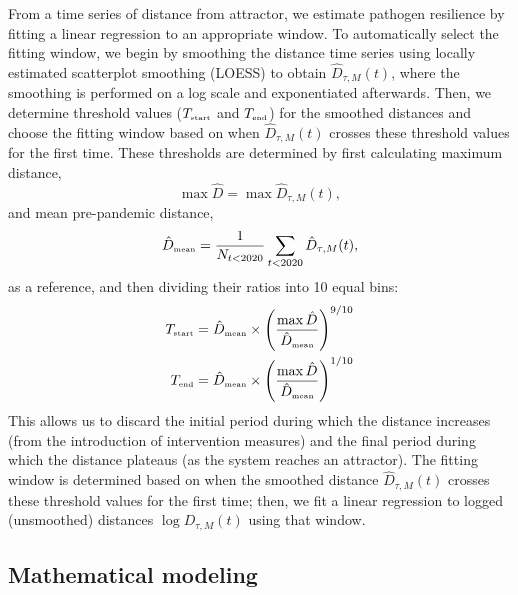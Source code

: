 \documentclass[12pt]{article}
\newcommand{\tsub}[2]{#1_{{\textrm{\tiny #2}}}}
\begin{document}
From a time series of distance from attractor, we estimate pathogen resilience by fitting a linear regression to an appropriate window.
To automatically select the fitting window, we begin by smoothing the distance time series using locally estimated scatterplot smoothing (LOESS) to obtain $\hat{D}_{\tau,M}(t)$, where the smoothing is performed on a log scale and exponentiated afterwards.
Then, we determine threshold values ($\tsub{T}{start}$ and $\tsub{T}{end}$) for the smoothed distances and choose the fitting window based on when $\hat{D}_{\tau,M}(t)$ crosses these threshold values for the first time.
These thresholds are determined by first calculating maximum distance,
\begin{equation}
\max \hat{D} = \max \hat{D}_{\tau,M}(t),
\end{equation}
and mean pre-pandemic distance,
\begin{equation}
\tsub{\hat{D}}{mean} = \frac{1}{N_{t<2020}} \sum_{t < 2020} \hat{D}_{\tau,M}(t),
\end{equation}
as a reference, and then dividing their ratios into 10 equal bins:
\begin{align}
\tsub{T}{start} &= \tsub{\hat{D}}{mean} \times \left(\frac{\max \hat{D}}{\tsub{\hat{D}}{mean}} \right)^{9/10}\\
\tsub{T}{end} &= \tsub{\hat{D}}{mean} \times \left(\frac{\max \hat{D}}{\tsub{\hat{D}}{mean}} \right)^{1/10}
\end{align}
This allows us to discard the initial period during which the distance increases (from the introduction of intervention measures) and the final period during which the distance plateaus (as the system reaches an attractor).
The fitting window is determined based on when the smoothed distance $\hat{D}_{\tau,M}(t)$ crosses these threshold values for the first time; then, we fit a linear regression to logged (unsmoothed) distances $\log D_{\tau,M}(t)$ using that window.

\subsection*{Mathematical modeling}
\end{document}

